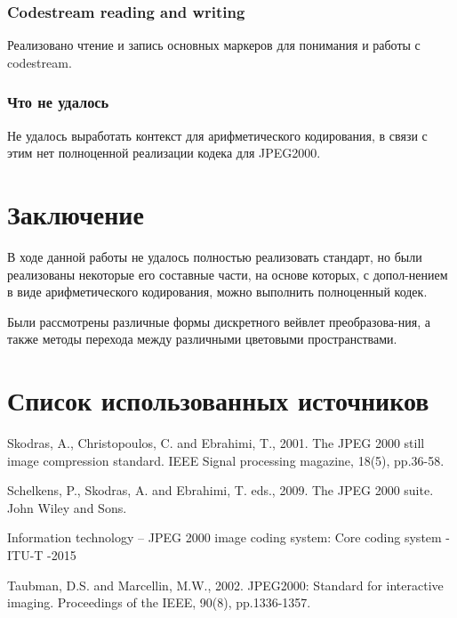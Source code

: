 \documentclass[a4paper]{article}
\begin{document}
  \subsubsection{Codestream reading and writing}

  Реализовано чтение и запись основных маркеров для понимания и работы с codestream.

  \subsubsection{Что не удалось}

  Не удалось выработать контекст для арифметического кодирования, в
  связи с этим нет полноценной реализации кодека для JPEG2000.

  \newpage
  \section{Заключение}

  В ходе данной работы не удалось полностью реализовать стандарт, но
  были реализованы некоторые его составные части, на основе которых, 
  с допол-нением в виде арифметического кодирования, можно выполнить
  полноценный кодек.

  Были рассмотрены различные формы дискретного вейвлет преобразова-ния,
  а также методы перехода между различными цветовыми пространствами.

  \newpage
  \section{Список использованных источников}

  \begin{thebibliography}{9}
    Skodras, A., Christopoulos, C. and Ebrahimi, T., 2001. The JPEG 2000 still image compression standard. IEEE Signal processing magazine, 18(5), pp.36-58.

    Schelkens, P., Skodras, A. and Ebrahimi, T. eds., 2009. The JPEG 2000 suite. John Wiley and Sons.

    Information technology – JPEG 2000 image coding system: Core coding system - ITU-T -2015
  
    Taubman, D.S. and Marcellin, M.W., 2002. JPEG2000: Standard for interactive imaging. Proceedings of the IEEE, 90(8), pp.1336-1357.
  \end{thebibliography}
\end{document}
